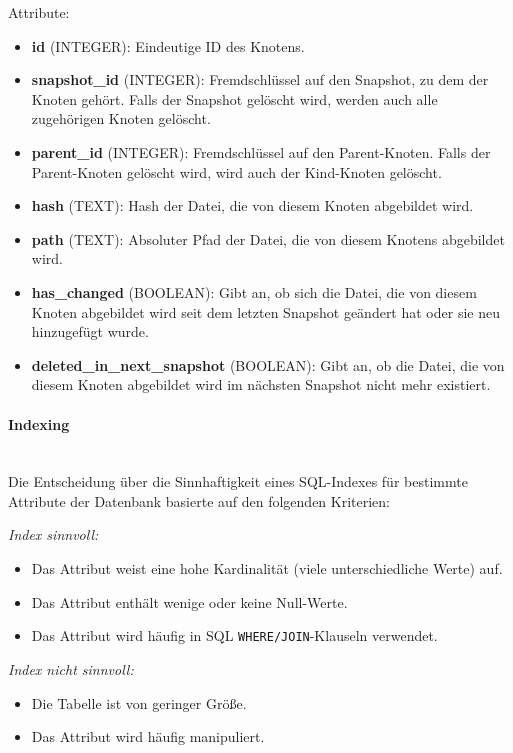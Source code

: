 \documentclass[a4paper,12pt]{report}
\begin{document}
    Attribute:
    \begin{itemize}
        \item \textbf{id} (INTEGER): Eindeutige ID des Knotens.
        \item \textbf{snapshot\_id} (INTEGER): Fremdschlüssel auf den Snapshot, zu dem der Knoten gehört.
        Falls der Snapshot gelöscht wird, werden auch alle zugehörigen Knoten gelöscht.
        \item \textbf{parent\_id} (INTEGER): Fremdschlüssel auf den Parent-Knoten.
        Falls der Parent-Knoten gelöscht wird, wird auch der Kind-Knoten gelöscht.
        \item \textbf{hash} (TEXT): Hash der Datei, die von diesem Knoten abgebildet wird.
        \item \textbf{path} (TEXT): Absoluter Pfad der Datei, die von diesem Knotens abgebildet wird.
        \item \textbf{has\_changed} (BOOLEAN): Gibt an, ob sich die Datei, die von diesem Knoten abgebildet wird
        seit dem letzten Snapshot geändert hat oder sie neu hinzugefügt wurde.
        \item \textbf{deleted\_in\_next\_snapshot} (BOOLEAN): Gibt an, ob die Datei, die von diesem Knoten abgebildet wird
        im nächsten Snapshot nicht mehr existiert.
    \end{itemize}

    \paragraph*{Indexing}\mbox{}\\
    Die Entscheidung über die Sinnhaftigkeit eines SQL-Indexes für bestimmte Attribute der Datenbank basierte auf den folgenden Kriterien:

    \textit{Index sinnvoll:}
    \begin{itemize}
        \item Das Attribut weist eine hohe Kardinalität (viele unterschiedliche Werte) auf.
        \item Das Attribut enthält wenige oder keine Null-Werte.
        \item Das Attribut wird häufig in SQL \texttt{WHERE/JOIN}-Klauseln verwendet.
    \end{itemize}

    \textit{Index nicht sinnvoll:}
    \begin{itemize}
        \item Die Tabelle ist von geringer Größe.
        \item Das Attribut wird häufig manipuliert.
    \end{itemize}
\end{document}
